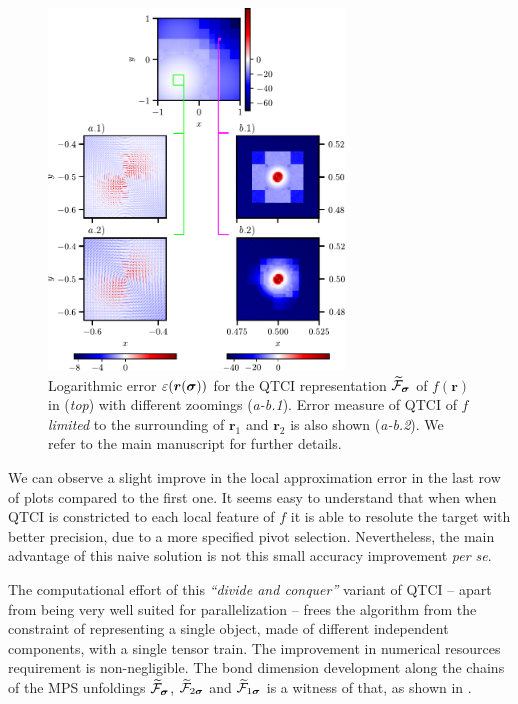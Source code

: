 \begin{figure}[ht!]
	\centering
	\includegraphics[width=0.7\textwidth]{figures/Error_heatmap_localFunc.pdf}
	\caption{Logarithmic error $\varepsilon(\boldsymbol{r}(\boldsymbol{\sigma}))$ for the QTCI representation $\widetilde{\mathcal{F}}_{\boldsymbol{\sigma}}$ of $f(\boldsymbol{r})$ in  (\textit{top}) with different zoomings (\textit{a-b.1}). Error measure of QTCI of $f$ \textit{limited} to the surrounding of $\boldsymbol{r}_1$ and $\boldsymbol{r}_2$ is also shown (\textit{a-b.2}). We refer to the main manuscript for further details. }
	\label{fig:errorLocalFunc}
\end{figure}


We can observe a slight improve in the local approximation error in the last row of plots compared to the first one. It seems easy to understand that when when QTCI is constricted to each local feature of $f$ it is able to resolute the target with better precision, due to a more specified pivot selection. Nevertheless, the main advantage of this naive solution is not this small accuracy improvement \textit{per se}. 

The computational effort of this \textit{``divide and conquer''} variant of QTCI -- apart from being very well suited for parallelization -- frees the algorithm from the constraint of representing a single object, made of different independent components, with a single tensor train. The improvement in numerical resources requirement is non-negligible. The bond dimension development along the chains of the MPS unfoldings $\widetilde{\mathcal{F}}_{\boldsymbol{\sigma}}$, $\widetilde{\mathcal{F}}_{2\boldsymbol{\sigma}}$ and $\widetilde{\mathcal{F}}_{1\boldsymbol{\sigma}}$ is a witness of that, as shown in . 

